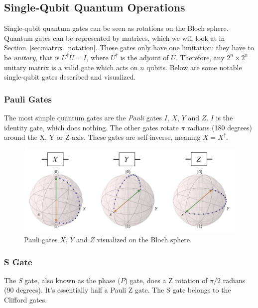 \documentclass[11pt]{article}
\begin{document}
\subsection{Single-Qubit Quantum Operations}
Single-qubit quantum gates can be seen as rotations on the Bloch sphere. Quantum gates can be represented by matrices, which we will look at in Section~\ref{sec:matrix_notation}. These gates only have one limitation: they have to be \emph{unitary}, that is $U^\dagger U = I$, where $U^\dagger$ is the adjoint of $U$. Therefore, any $2^n \times 2^n$ unitary matrix is a valid gate which acts on $n$ qubits. Below are some notable single-qubit gates described and visualized.

\subsubsection{Pauli Gates}
 The most simple quantum gates are the \emph{Pauli} gates $I$, $X$, $Y$ and $Z$. $I$ is the identity gate, which does nothing. The other gates rotate $\pi$ radians (180 degrees) around the X, Y or Z-axis. These gates are self-inverse, meaning $X = X^\dagger$.

\begin{figure}[ht]
  \begin{adjustwidth}{-2.5cm}{-2.5cm}
  \centering
  \includegraphics[scale=0.25]{images/pauli_gates.eps}
  \caption{Pauli gates $X$, $Y$ and $Z$ visualized on the Bloch sphere.}
  \end{adjustwidth}
\end{figure}

 
\subsubsection{S Gate}
The \emph{S} gate, also known as the phase ($P$) gate, does a Z rotation of $\pi/2$ radians (90 degrees). It's essentially half a Pauli Z gate. The S gate belongs to the Clifford gates.
\end{document}
